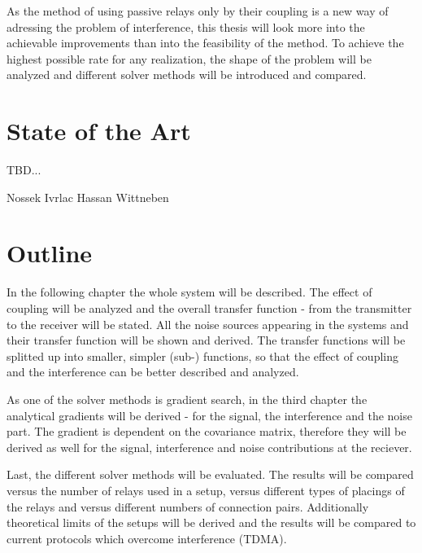 As the method of using passive relays only by their coupling is a new way of adressing the problem of interference, this thesis will look more into the achievable improvements than into the feasibility of the method.
To achieve the highest possible rate for any realization, the shape of the problem will be analyzed and different solver methods will be introduced and compared.


\section{State of the Art}
\label{sec:SoA}

TBD...

Nossek Ivrlac
Hassan Wittneben




\section{Outline}
\label{sec:outline}

In the following chapter the whole system will be described.
The effect of coupling will be analyzed and the overall transfer function - from the transmitter to the receiver will be stated.
All the noise sources appearing in the systems and their transfer function will be shown and derived.
The transfer functions will be splitted up into smaller, simpler (sub-) functions, so that the effect of coupling and the interference can be better described and analyzed.

As one of the solver methods is gradient search, in the third chapter the analytical gradients will be derived - for the signal, the interference and the noise part.
The gradient is dependent on the covariance matrix, therefore they will be derived as well for the signal, interference and noise contributions at the reciever.

Last, the different solver methods will be evaluated.
The results will be compared versus the number of relays used in a setup,
versus different types of placings of the relays and versus different numbers of connection pairs.
Additionally theoretical limits of the setups will be derived and the results will be compared to current protocols which overcome interference (TDMA).








